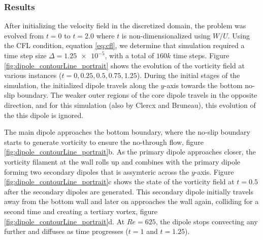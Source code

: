 \subsubsection*{Results}
After initializing the velocity field in the discretized domain, the problem was evolved from $t=0$ to $t=2.0$ where $t$ is non-dimensionalized using $W/U$. Using the CFL condition, equation \ref{eq:cfl}, we determine that simulation required a time step size $\Delta = \num{1.25e-5}$, with a total of $160k$ time steps. Figure \ref{fig:dipole_contourLine_portrait} shows the evolution of the vorticity field at various instances ($t = 0, 0.25, 0.5, 0.75, 1.25$). During the initial stages of the simulation, the initialized dipole travels along the $y$-axis towards the bottom no-slip boundary. The weaker outer regions of the core dipole travels in the opposite direction, and for this simulation (also by Clercx and Bruneau), this evolution of the this dipole is ignored. 

The main dipole approaches the bottom boundary, where the no-slip boundary starts to generate vorticity to ensure the no-through flow, figure \ref{fig:dipole_contourLine_portrait}b. As the primary dipole approaches closer, the vorticity filament at the wall rolls up and combines with the primary dipole forming two secondary dipoles that is assymteric across the $y$-axis. Figure \ref{fig:dipole_contourLine_portrait}c shows the state of the vorticity field at $t=0.5$ after the secondary dipoles are generated. This secondary dipole initially travels away from the bottom wall and later on approaches the wall again, colliding for a second time and creating a tertiary vortex, figure \ref{fig:dipole_contourLine_portrait}d. At $Re=625$, the dipole stops convecting any further and diffuses as time progresses ($t = 1$ and $t = 1.25$).

